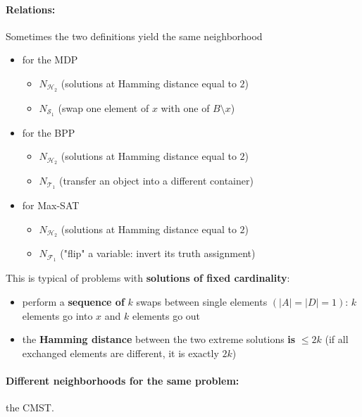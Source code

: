 \newpage

\paragraph{Relations:} Sometimes the two definitions yield the same neighborhood
\begin{itemize}
	\item for the MDP
	\begin{itemize}
		\item $N_{\mathcal{H}_2}$ (solutions at Hamming distance equal to $2$)
		\item $N_{\mathcal{S}_1}$ (swap one element of $x$ with one of $B \setminus x$)
	\end{itemize}
	\nn
	
	\item for the BPP
	\begin{itemize}
		\item $N_{\mathcal{H}_2}$ (solutions at Hamming distance equal to $2$)
		\item $N_{\mathcal{T}_1}$ (transfer an object into a different container)
	\end{itemize}
	\nn
	
	\item for Max-SAT
	\begin{itemize}
		\item $N_{\mathcal{H}_2}$ (solutions at Hamming distance equal to $2$)
		\item $N_{\mathcal{F}_1}$ ("flip" a variable: invert its truth assignment)
	\end{itemize}
	\nn
\end{itemize}

This is typical of problems with \textbf{solutions of fixed cardinality}:
\begin{itemize}
	\item perform a \textbf{sequence of} $k$ swaps between single elements $(|A| = |D| = 1)$: $k$ elements go into $x$ and $k$ elements go out
	
	\nn
	
	\item the \textbf{Hamming distance} between the two extreme solutions \textbf{is} $\leq 2k$ (if all exchanged elements are different, it is exactly $2k$)
\end{itemize}

\newpage

\paragraph{Different neighborhoods for the same problem:} the CMST.\\

